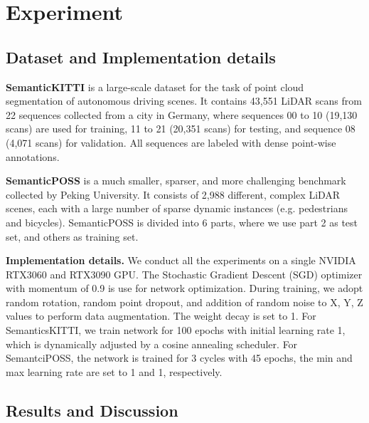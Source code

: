 \documentclass{article}
\begin{document}
\section{Experiment}

\subsection{Dataset and Implementation details}
\noindent\textbf{SemanticKITTI} is a large-scale dataset for the task of point cloud segmentation of autonomous driving scenes. It contains 43,551 LiDAR scans from 22 sequences collected from a city in Germany, where sequences 00 to 10 (19,130 scans) are used for training, 11 to 21 (20,351 scans) for testing, and sequence 08 (4,071 scans) for validation. All sequences are labeled with dense point-wise annotations.

\noindent\textbf{SemanticPOSS} is a much smaller, sparser, and more challenging benchmark collected by Peking University. It consists of 2,988 different, complex LiDAR scenes, each with a large number of sparse dynamic instances (e.g. pedestrians and bicycles). SemanticPOSS is divided into 6 parts, where we use part 2 as test set, and others as training set. 

\noindent\textbf{Implementation details.}  We conduct all the experiments on a single NVIDIA RTX3060 and RTX3090 GPU. The Stochastic Gradient Descent (SGD) optimizer with momentum of 0.9 is use for network optimization. During training, we adopt random rotation, random point dropout, and addition of random noise to X, Y, Z values to perform data augmentation. The weight decay is set to 1. For SemanticsKITTI, we train network for 100 epochs with initial learning rate 1, which is dynamically adjusted by a cosine annealing scheduler. For SemantciPOSS, the network is trained for 3 cycles with 45 epochs, the min and max learning rate are set to 1 and 1, respectively. 

\subsection{Results and Discussion}
\end{document}
